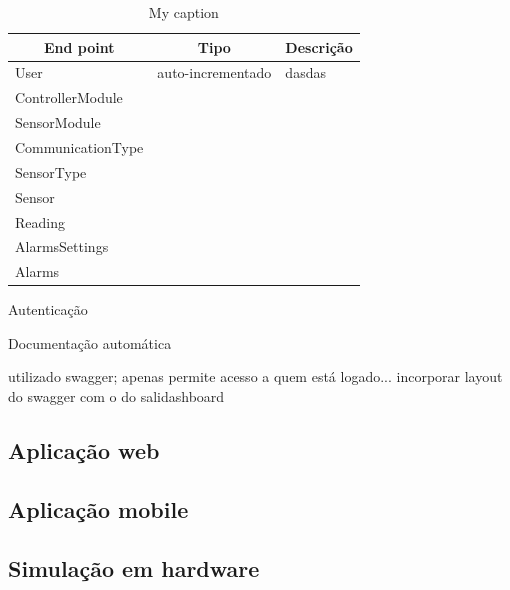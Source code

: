 \begin{table}[h]
	\centering
	\begin{tabular}{|l|l|l|}
		\hline
		\multicolumn{1}{|c|}{\textbf{End point}} & \multicolumn{1}{c|}{\textbf{Tipo}} & \multicolumn{1}{c|}{\textbf{Descrição}} \\ \hline
		User & auto-incrementado & dasdas \\ \hline
		ControllerModule&  &  \\ \hline
		SensorModule&  &  \\ \hline
		CommunicationType&  &  \\ \hline
		SensorType&  &  \\ \hline
		Sensor&  &  \\ \hline
		Reading&  &  \\ \hline
		AlarmsSettings&  &  \\ \hline
		Alarms&  &  \\ \hline
	\end{tabular}
	\caption{My caption}
	\label{my-label}
\end{table}

Autenticação

Documentação automática





utilizado swagger; apenas permite acesso a quem está logado... incorporar layout do swagger com o do salidashboard




\newpage




\subsection{Aplicação web}


\subsection{Aplicação mobile}




\newpage
\subsection{Simulação em hardware}

